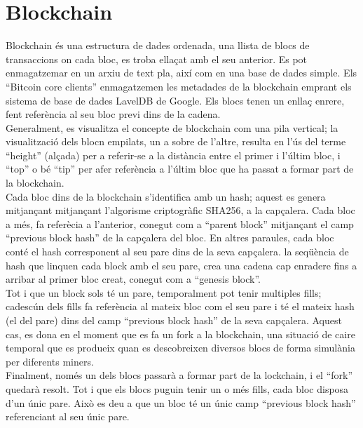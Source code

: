 \section{Blockchain}
\label{blockchain}
Blockchain és una estructura de dades ordenada, una llista de blocs de transaccions on cada bloc, es troba ellaçat amb el seu anterior.
\newline Es pot enmagatzemar en un arxiu de text pla, així com en una base de dades simple. Els “Bitcoin core clients” enmagatzemen les metadades de la blockchain emprant els sistema de base de dades LavelDB de Google. Els blocs tenen un enllaç enrere, fent referència al seu bloc previ dins de la cadena.\\
\newline Generalment, es visualitza el concepte de blockchain com una pila vertical; la visualització dels blocn empilats, un a sobre de l’altre, resulta en l’ús del terme “height” (alçada) per a referir-se a la distància entre el primer i l’últim bloc, i “top” o bé “tip” per afer referència a l’últim bloc que ha passat a formar part de la blockchain.\\
\newline Cada bloc dins de la blockchain s’identifica amb un hash; aquest es genera mitjançant mitjançant l’algorisme criptogràfic SHA256, a la capçalera. Cada bloc a més, fa referècia a l’anterior, conegut com a “parent block” mitjançant el camp “previous block hash” de la capçalera del bloc. En altres paraules, cada bloc conté el hash corresponent al seu pare dins de la seva capçalera. la seqüència de hash que linquen cada block amb el seu pare, crea una cadena cap enradere fins a arribar al primer bloc creat, conegut com a “genesis block”.\\
\newline Tot i que un block sols té un pare, temporalment pot tenir multiples fills; cadescún dels fills fa referència al mateix bloc com el seu pare i té el mateix hash (el del pare) dins del camp “previous block hash” de la seva capçalera. Aquest cas, es dona en el moment que es fa un fork a la blockchain, una situació de caire temporal que es produeix quan es descobreixen diversos blocs de forma simulània per diferents miners.\\
Finalment, només un dels blocs passarà a formar part de la lockchain, i el “fork” quedarà resolt. Tot i que els blocs puguin tenir un o més fills, cada bloc disposa d’un únic pare. Això es deu a que un bloc té un únic camp “previous block hash” referenciant al seu únic pare.\\
